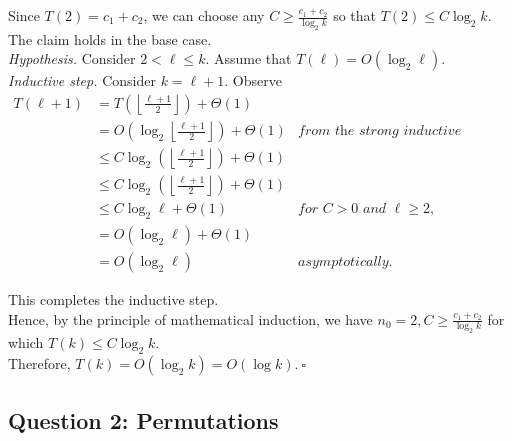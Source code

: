 \begin{solution}
\noindent Since $T(2)=c_1+c_2$, we can choose any $C\geq\frac{c_1+c_2}{\log_2{k}}$ so that $T(2)\leq C\log_2{k}$. The claim holds in the base case.\\

\noindent\textit{Hypothesis. }Consider $2<\ell\leq k$. Assume that $T(\ell)=O(\log_2\ell)$.\\

\noindent\textit{Inductive step. }Consider $k=\ell+1$. Observe
\begin{align*}
T(\ell+1)
&=T\left(\left\lfloor\frac{\ell+1}{2}\right\rfloor\right)+\Theta(1)\\
&=O\left(\log_2\left\lfloor\frac{\ell+1}{2}\right\rfloor\right)+\Theta(1)&\textit{from the strong inductive hypothesis,}\\
&\leq C\log_2\left(\left\lfloor\frac{\ell+1}{2}\right\rfloor\right)+\Theta(1)\\
&\leq C\log_2\left(\left\lfloor\frac{\ell+1}{2}\right\rfloor\right)+\Theta(1)\\
&\leq C\log_2\ell+\Theta(1)&\textit{for $C>0$ and $\ell\geq 2,$}\\
&=O(\log_2\ell)+\Theta(1)\\
&=O(\log_2\ell)&\textit{asymptotically.}
\end{align*}

\noindent This completes the inductive step.\\

\noindent Hence, by the principle of mathematical induction, we have $n_0=2,C\geq\frac{c_1+c_2}{\log_2k}$ for which $T(k)\leq C\log_2k$.\\

\noindent Therefore, $T(k)=O(\log_2k)=O(\log k)$.$~\square$
\end{solution}
\subsection*{Question 2: Permutations}

